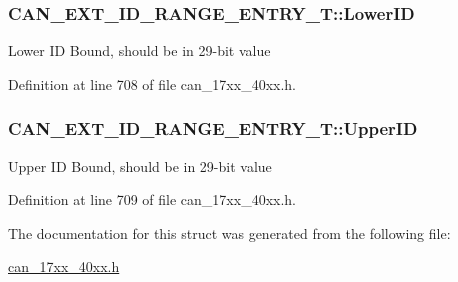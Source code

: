 \subsubsection[{\texorpdfstring{Lower\+ID}{LowerID}}]{ C\+A\+N\+\_\+\+E\+X\+T\+\_\+\+I\+D\+\_\+\+R\+A\+N\+G\+E\+\_\+\+E\+N\+T\+R\+Y\+\_\+\+T\+::\+Lower\+ID}\hypertarget{structCAN__EXT__ID__RANGE__ENTRY__T_a704cb0823b253cecdb54c0cff24f5fac}{}\label{structCAN__EXT__ID__RANGE__ENTRY__T_a704cb0823b253cecdb54c0cff24f5fac}
Lower ID Bound, should be in 29-\/bit value 

Definition at line 708 of file can\+\_\+17xx\+\_\+40xx.\+h.

\subsubsection[{\texorpdfstring{Upper\+ID}{UpperID}}]{ C\+A\+N\+\_\+\+E\+X\+T\+\_\+\+I\+D\+\_\+\+R\+A\+N\+G\+E\+\_\+\+E\+N\+T\+R\+Y\+\_\+\+T\+::\+Upper\+ID}\hypertarget{structCAN__EXT__ID__RANGE__ENTRY__T_a6889adbc72854cce6891e7595a96bf3d}{}\label{structCAN__EXT__ID__RANGE__ENTRY__T_a6889adbc72854cce6891e7595a96bf3d}
Upper ID Bound, should be in 29-\/bit value 

Definition at line 709 of file can\+\_\+17xx\+\_\+40xx.\+h.



The documentation for this struct was generated from the following file\+:\begin{DoxyCompactItemize}
\item 
\hyperlink{can__17xx__40xx_8h}{can\+\_\+17xx\+\_\+40xx.\+h}\end{DoxyCompactItemize}
